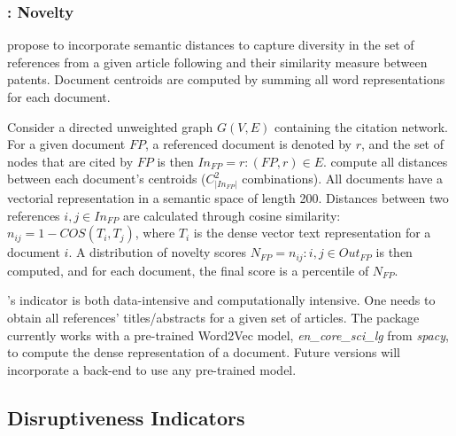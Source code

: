 \subsubsection{\cite{shibayama2021measuring}: Novelty}

\cite{shibayama2021measuring} propose to incorporate semantic distances to capture diversity in the set of references from a given article following \cite{hain2020text} and their similarity measure between patents. Document centroids are computed by summing all word representations for each document.

Consider a directed unweighted graph $G(V, E)$ containing the citation network. For a given document $FP$, a referenced document is denoted by $r$, and the set of nodes that are cited by $FP$ is then $In_{FP} = {r : (FP,r) \in E }$. \cite{shibayama2021measuring} compute all distances between each document's centroids ($C_{|In_{FP}|}^{2}$ combinations). All documents have a vectorial representation in a semantic space of length 200. Distances between two references $i, j \in In_{FP}$ are calculated through cosine similarity: $n_{ij} = 1-COS(T_i, T_j)$, where $T_i$ is the dense vector text representation for a document $i$. A distribution of novelty scores $N_{FP} = {n_{ij}: i,j \in Out_{FP}}$ is then computed, and for each document, the final score is a percentile of $N_{FP}$.

\begin{figure}[h!]
  \centering
  
  \caption[\cite{shibayama2021measuring} ]{\cite{shibayama2021measuring} \footnotemark }
\end{figure}

\cite{shibayama2021measuring}'s indicator is both data-intensive and computationally intensive. One needs to obtain all references' titles/abstracts for a given set of articles.
The package currently works with a pre-trained Word2Vec model, \textit{en\_core\_sci\_lg} from \textit{spacy}, to compute the dense representation of a document. Future versions will incorporate a back-end to use any pre-trained model.
 
 

\subsection{Disruptiveness Indicators}

